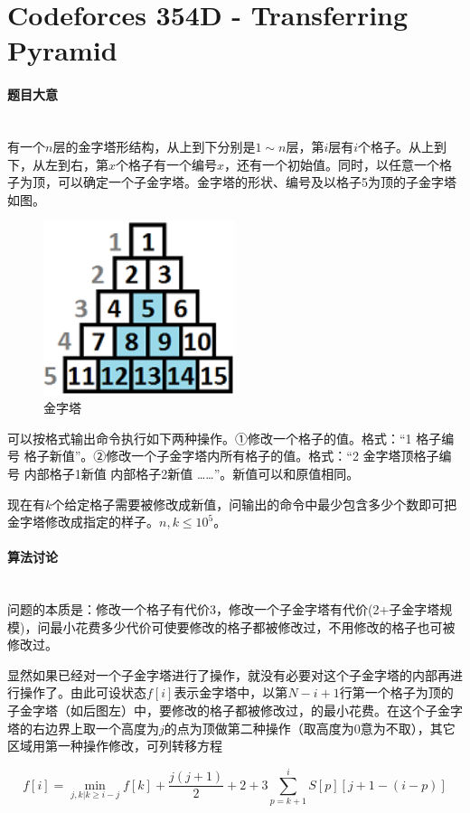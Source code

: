 \documentclass[UTF8]{ctexart}
\newcommand{\myparagraph}[1]{\paragraph{#1}\mbox{}\\}
\theoremstyle{nonumberplain}
\begin{document}
	\section{Codeforces 354D - Transferring Pyramid}
	
		\myparagraph{题目大意}
		
			有一个$n$层的金字塔形结构，从上到下分别是$1 \sim n$层，第$i$层有$i$个格子。从上到下，从左到右，第$x$个格子有一个编号$x$，还有一个初始值。同时，以任意一个格子为顶，可以确定一个子金字塔。金字塔的形状、编号及以格子5为顶的子金字塔如图。
			
			\begin{figure}[ht]
				\centering
				\includegraphics[width=0.5\textwidth]{fig354d_1.png}
				\caption{金字塔}
			\end{figure}
			
			可以按格式输出命令执行如下两种操作。①修改一个格子的值。格式：“1 格子编号 格子新值”。②修改一个子金字塔内所有格子的值。格式：“2 金字塔顶格子编号 内部格子1新值 内部格子2新值 ……”。新值可以和原值相同。
			
			现在有$k$个给定格子需要被修改成新值，问输出的命令中最少包含多少个数即可把金字塔修改成指定的样子。$n,k \leq 10^5$。
		
		\myparagraph{算法讨论}
		
			问题的本质是：修改一个格子有代价3，修改一个子金字塔有代价(2+子金字塔规模)，问最小花费多少代价可使要修改的格子都被修改过，不用修改的格子也可被修改过。
			
			显然如果已经对一个子金字塔进行了操作，就没有必要对这个子金字塔的内部再进行操作了。由此可设状态$f[i]$表示金字塔中，以第$N-i+1$行第一个格子为顶的子金字塔（如后图左）中，要修改的格子都被修改过，的最小花费。在这个子金字塔的右边界上取一个高度为$j$的点为顶做第二种操作（取高度为0意为不取），其它区域用第一种操作修改，可列转移方程
			
			$$ f[i]=\min_{j,k|k \geq i-j} f[k]+\frac{j(j+1)}{2}+2+3\sum_{p=k+1}^i S[p][j+1-(i-p)] $$
			
\end{document}
